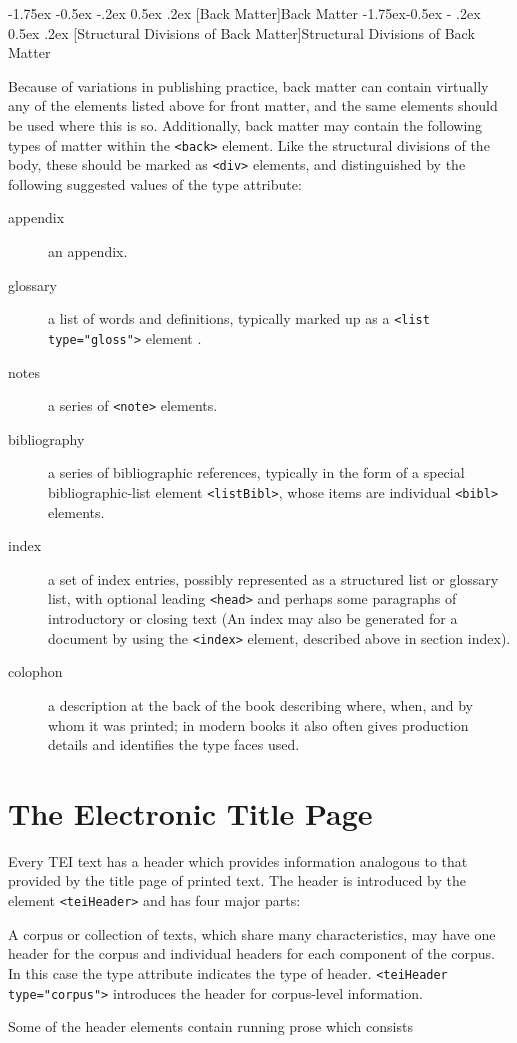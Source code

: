 \documentclass[11pt,twoside]{article}\makeatletter
\makeatletter
\renewcommand\section{\@startsection {section}{1}{\z@}%
     {-1.75ex \@plus -0.5ex \@minus -.2ex}%
     {0.5ex \@plus .2ex}%
     {\reset@font\Large\bfseries\sffamily}}
\renewcommand\subsection{\@startsection{subsection}{2}{\z@}%
     {-1.75ex\@plus -0.5ex \@minus- .2ex}%
     {0.5ex \@plus .2ex}%
     {\reset@font\Large\sffamily}}
\renewcommand\subsubsection{\@startsection{subsubsection}{3}{\z@}%
     {-1.5ex\@plus -0.35ex \@minus -.2ex}%
     {0.5ex \@plus .2ex}%
     {\reset@font\large\sffamily}}
\def\DivI{\section}
\def\DivII{\subsection}
\def\DivIII{\subsubsection}
\def\DivI{\chapter}
\def\DivII{\section}
\def\DivIII{\subsection}
\makeatother
\begin{document}
\DivII[Back Matter]{Back Matter}
\DivIII[Structural Divisions of Back Matter]{Structural Divisions of Back Matter}\par Because of variations in publishing practice, back matter can
contain virtually any of the elements listed above for front matter,
and the same elements should be used where this is so.  Additionally,
back matter may contain the following types of matter within the
\texttt{<back>} element.  Like the structural divisions of the body,
these should be marked as  \texttt{<div>} elements,
and distinguished by the following suggested values of the
type attribute:
\begin{description}

\item[appendix]an
appendix.
\item[glossary]a list of
words and definitions, typically marked up as a  \texttt{<list type="gloss">}
element
.
\item[notes]a series of \texttt{<note>}
elements.
\item[bibliography]a series of bibliographic references, typically in the form of
a special bibliographic-list element \texttt{<listBibl>}, whose items
are individual \texttt{<bibl>} elements.
\item[index]a set of index entries, possibly represented as a structured
list or glossary list, with optional leading
\texttt{<head>} and perhaps some paragraphs of introductory or closing
text (An index may also be generated for a document by using the
\texttt{<index>} element, described above in section 
index).
\item[colophon]a description at the back of the book describing where, when,
and by whom it was printed; in modern books it also often gives
production details and identifies the type faces used.
\end{description} 
\DivI[The Electronic Title Page]{The Electronic Title Page}\label{U5-header}\par Every TEI text has a header which provides information analogous
to that provided by the title page of printed text. The header is
introduced by the element \texttt{<teiHeader>} and has four major
parts:
\par     A corpus or collection of texts, which share many
characteristics, may have one header for the corpus and individual
headers for each component of the corpus.  In this case the type
attribute indicates the type of header.
\texttt{<teiHeader type="corpus">} introduces the header for corpus-level information.\par Some of the header elements contain running prose which consists
\end{document}
